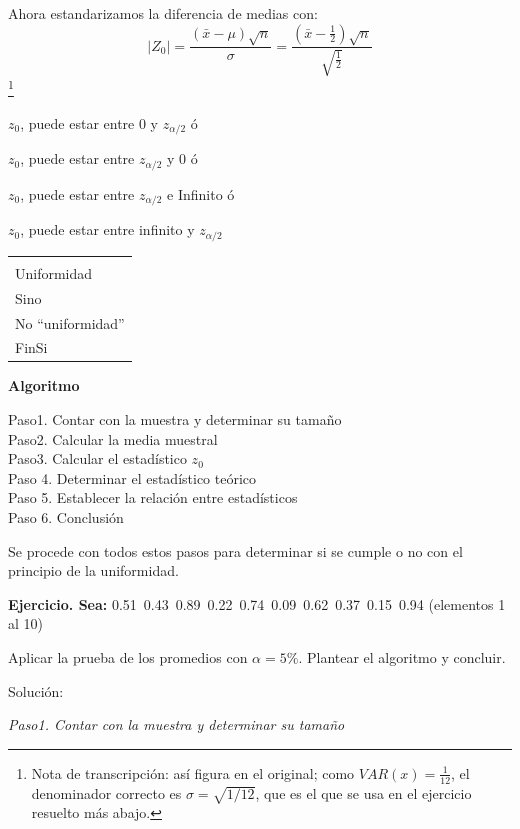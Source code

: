 \documentclass[11pt,letterpaper]{report}
\newenvironment{algoritmo}
  {\begin{center}\begin{tabular}{|p{0.85\textwidth}|}\hline\vspace{-0.2cm}\begin{tabbing}\hspace{0.6cm}\=\hspace{0.6cm}\=\hspace{0.6cm}\=\hspace{0.6cm}\=\hspace{0.6cm}\=\kill}
  {\end{tabbing}\vspace{-0.4cm}\\\hline\end{tabular}\end{center}}
\begin{document}
Ahora estandarizamos la diferencia de medias con:
\[
|Z_0| = \frac{(\bar{x} - \mu)\sqrt{n}}{\sigma} = \frac{\left(\bar{x} - \frac{1}{2}\right)\sqrt{n}}{\sqrt{\frac{1}{2}}}
\]
\footnote{Nota de transcripción: así figura en el original; como $VAR(x) = \frac{1}{12}$, el denominador correcto es $\sigma = \sqrt{1/12}$, que es el que se usa en el ejercicio resuelto más abajo.}

\begin{center}
\end{center}

$z_0$, puede estar entre 0 y $z_{\alpha/2}$ ó

$z_0$, puede estar entre $z_{\alpha/2}$ y 0 ó

$z_0$, puede estar entre $z_{\alpha/2}$ e Infinito ó

$z_0$, puede estar entre infinito y $z_{\alpha/2}$

\begin{algoritmo}
\>Si ($z_0 < z_{\alpha/2}$)\\
\>\>Uniformidad\\
\>Sino\\
\>\>No ``uniformidad''\\
\>FinSi
\end{algoritmo}

\textbf{Algoritmo}

Paso1. Contar con la muestra y determinar su tamaño\\
Paso2. Calcular la media muestral\\
Paso3. Calcular el estadístico $z_0$\\
Paso 4. Determinar el estadístico teórico\\
Paso 5. Establecer la relación entre estadísticos\\
Paso 6. Conclusión

Se procede con todos estos pasos para determinar si se cumple o no con el principio de la uniformidad.

\textbf{Ejercicio. Sea:} 0.51\ 0.43\ 0.89\ 0.22\ 0.74\ 0.09\ 0.62\ 0.37\ 0.15\ 0.94 \quad (elementos 1 al 10)

Aplicar la prueba de los promedios con $\alpha = 5\%$. Plantear el algoritmo y concluir.

Solución:

\textit{Paso1. Contar con la muestra y determinar su tamaño}
\end{document}
